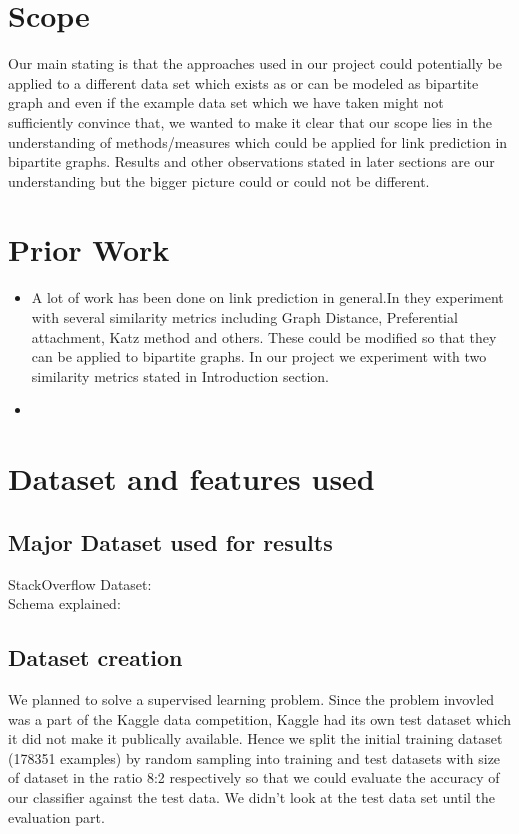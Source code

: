 \documentclass[letterpaper,twocolumn,11pt]{article}
\begin{document}
\section{Scope}

Our main stating is that the approaches used in our project could potentially be applied to a different data set which exists as or can be modeled as bipartite graph and even if the example data set which we have taken might not sufficiently convince that, we wanted to make it clear that our scope lies in the understanding of methods/measures which could be applied for link prediction in bipartite graphs. Results and other observations stated in later sections are our understanding but the bigger picture could or could not be different. 

\section{Prior Work}

\begin{itemize}

\item[] A lot of work has been done on link prediction in general.In \cite{four} they experiment with several similarity metrics including Graph Distance, Preferential attachment, Katz method and others. These could be modified so that they can be applied to bipartite graphs. In our project we experiment with two similarity metrics stated in Introduction section.

\item[] 

\end{itemize}

\section{Dataset and features used}

\subsection{Major Dataset used for results}
StackOverflow Dataset:\\
Schema explained: 

\subsection{Dataset creation}
We planned to solve a supervised learning problem.
Since the problem invovled was a part of the Kaggle data competition, Kaggle had its own test dataset which it did not make it publically available. Hence we split the  initial training dataset \cite{stackdataset} (178351 examples) by random sampling into training and test datasets with size of dataset in the ratio 8:2 respectively so that we could evaluate the accuracy of our classifier against the test data.
We didn't look at the test data set until the evaluation part.
\end{document}
